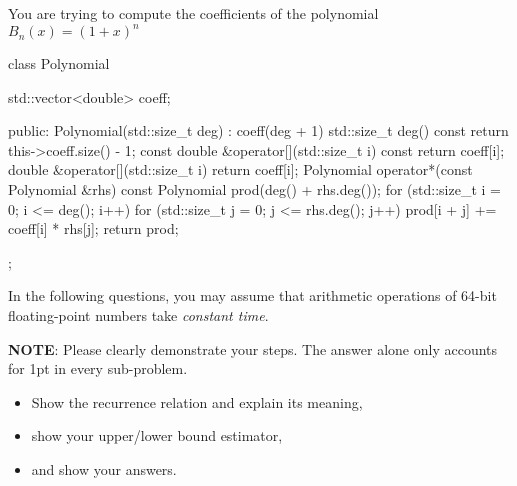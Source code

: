 
\newcommand{\emphA}[1]{\textit{#1}}
\newcommand{\emphB}[1]{\textbf{#1}}

You are trying to compute the coefficients of the polynomial \(B_n(x) = {(1+x)}^n\)

\begin{cpp}
class Polynomial {
  std::vector<double> coeff;

 public:
  Polynomial(std::size_t deg) : coeff(deg + 1) {}
  std::size_t deg() const { return this->coeff.size() - 1; }
  const double &operator[](std::size_t i) const { return coeff[i]; }
  double &operator[](std::size_t i) { return coeff[i]; }
  Polynomial operator*(const Polynomial &rhs) const {
    Polynomial prod(deg() + rhs.deg());
    for (std::size_t i = 0; i <= deg(); i++)
      for (std::size_t j = 0; j <= rhs.deg(); j++)
        prod[i + j] += coeff[i] * rhs[j];
    return prod;
  }
};
\end{cpp}

In the following questions, you may assume that arithmetic operations of 64-bit floating-point numbers take \emphA{constant time}.\par
\emphB{NOTE}: Please clearly demonstrate your steps. The answer alone only accounts for 1pt in every sub-problem.
\begin{itemize}
  \item Show the recurrence relation and explain its meaning,
  \item show your upper/lower bound estimator,
  \item and show your answers.
\end{itemize}

